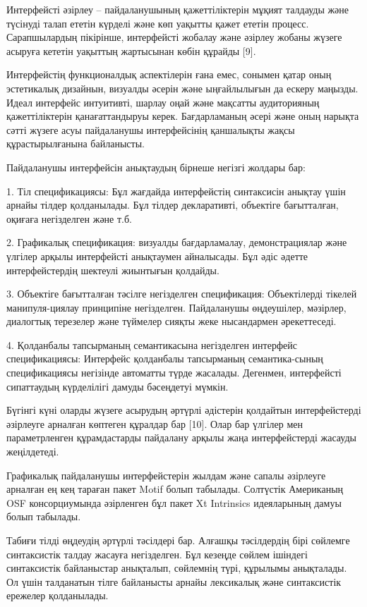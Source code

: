 \begin{multicols}{2}
Интерфейсті әзірлеу -- пайдаланушының қажеттіліктерін мұқият талдауды
және түсінуді талап ететін күрделі және көп уақытты қажет ететін
процесс. Сарапшылардың пікірінше, интерфейсті жобалау және әзірлеу
жобаны жүзеге асыруға кететін уақыттың жартысынан көбін құрайды {[}9{]}.

Интерфейстің функционалдық аспектілерін ғана емес, сонымен қатар оның
эстетикалық дизайнын, визуалды әсерін және ыңғайлылығын да ескеру
маңызды. Идеал интерфейс интуитивті, шарлау оңай және мақсатты
аудиторияның қажеттіліктерін қанағаттандыруы керек. Бағдарламаның әсері
және оның нарықта сәтті жүзеге асуы пайдаланушы интерфейсінің қаншалықты
жақсы құрастырылғанына байланысты.

Пайдаланушы интерфейсін анықтаудың бірнеше негізгі жолдары бар:

1. Тіл спецификациясы: Бұл жағдайда интерфейстің синтаксисін анықтау
үшін арнайы тілдер қолданылады. Бұл тілдер декларативті, объектіге
бағытталған, оқиғаға негізделген және т.б.

2. Графикалық спецификация: визуалды бағдарламалау, демонстрациялар және
үлгілер арқылы интерфейсті анықтаумен айналысады. Бұл әдіс әдетте
интерфейстердің шектеулі жиынтығын қолдайды.

3. Объектіге бағытталған тәсілге негізделген спецификация: Объектілерді
тікелей манипуля-циялау принципіне негізделген. Пайдаланушы өңдеушілер,
мәзірлер, диалогтық терезелер және түймелер сияқты жеке нысандармен
әрекеттеседі.

4. Қолданбалы тапсырманың семантикасына негізделген интерфейс
спецификациясы: Интерфейс қолданбалы тапсырманың семантика-сының
спецификациясы негізінде автоматты түрде жасалады. Дегенмен, интерфейсті
сипаттаудың күрделілігі дамуды бәсеңдетуі мүмкін.

Бүгінгі күні оларды жүзеге асырудың әртүрлі әдістерін қолдайтын
интерфейстерді әзірлеуге арналған көптеген құралдар бар {[}10{]}. Олар
бар үлгілер мен параметрленген құрамдастарды пайдалану арқылы жаңа
интерфейстерді жасауды жеңілдетеді.

Графикалық пайдаланушы интерфейстерін жылдам және сапалы әзірлеуге
арналған ең кең тараған пакет Motif болып табылады. Солтүстік Американың
OSF консорциумында әзірленген бұл пакет Xt Intrinsics идеяларының дамуы
болып табылады.

Табиғи тілді өңдеудің әртүрлі тәсілдері бар. Алғашқы тәсілдердің бірі
сөйлемге синтаксистік талдау жасауға негізделген. Бұл кезеңде сөйлем
ішіндегі синтаксистік байланыстар анықталып, сөйлемнің түрі, құрылымы
анықталады. Ол үшін талданатын тілге байланысты арнайы лексикалық және
синтаксистік ережелер қолданылады.


\end{multicols}
